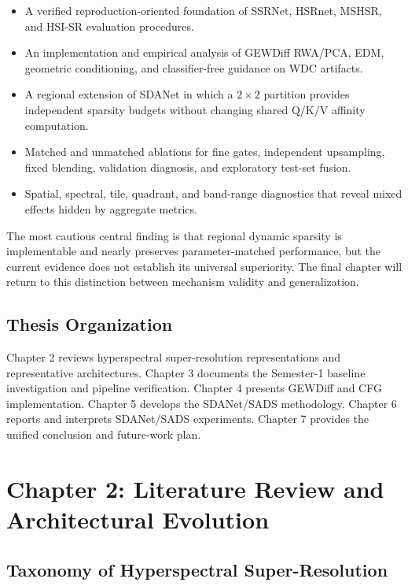 \documentclass[10pt,twocolumn,letterpaper]{article}
\begin{document}
\begin{itemize}
    \item A verified reproduction-oriented foundation of SSRNet, HSRnet, MSHSR, and HSI-SR evaluation procedures.
    \item An implementation and empirical analysis of GEWDiff RWA/PCA, EDM, geometric conditioning, and classifier-free guidance on WDC artifacts.
    \item A regional extension of SDANet in which a $2\times2$ partition provides independent sparsity budgets without changing shared Q/K/V affinity computation.
    \item Matched and unmatched ablations for fine gates, independent upsampling, fixed blending, validation diagnosis, and exploratory test-set fusion.
    \item Spatial, spectral, tile, quadrant, and band-range diagnostics that reveal mixed effects hidden by aggregate metrics.
\end{itemize}

The most cautious central finding is that regional dynamic sparsity is implementable and nearly preserves parameter-matched performance, but the current evidence does not establish its universal superiority. The final chapter will return to this distinction between mechanism validity and generalization.

\subsection{Thesis Organization}

Chapter 2 reviews hyperspectral super-resolution representations and representative architectures. Chapter 3 documents the Semester-1 baseline investigation and pipeline verification. Chapter 4 presents GEWDiff and CFG implementation. Chapter 5 develops the SDANet/SADS methodology. Chapter 6 reports and interprets SDANet/SADS experiments. Chapter 7 provides the unified conclusion and future-work plan.

\section{Chapter 2: Literature Review and Architectural Evolution}
\label{sec:literature}

\subsection{Taxonomy of Hyperspectral Super-Resolution}
\end{document}
